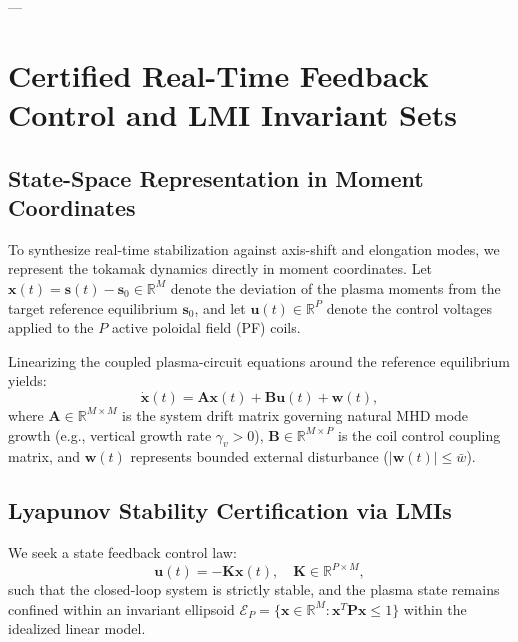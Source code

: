 \documentclass[11pt,a4paper]{article}
\begin{document}
---

\section{Certified Real-Time Feedback Control and LMI Invariant Sets}

\subsection{State-Space Representation in Moment Coordinates}
To synthesize real-time stabilization against axis-shift and elongation modes, we represent the tokamak dynamics directly in moment coordinates. Let $\bm{x}(t) = \bm{s}(t) - \bm{s}_0 \in \mathbb{R}^M$ denote the deviation of the plasma moments from the target reference equilibrium $\bm{s}_0$, and let $\bm{u}(t) \in \mathbb{R}^P$ denote the control voltages applied to the $P$ active poloidal field (PF) coils.

Linearizing the coupled plasma-circuit equations around the reference equilibrium yields:
\begin{equation}
    \dot{\bm{x}}(t) = \bm{A} \bm{x}(t) + \bm{B} \bm{u}(t) + \bm{w}(t),
    \label{eq:state_space}
\end{equation}
where $\bm{A} \in \mathbb{R}^{M \times M}$ is the system drift matrix governing natural MHD mode growth (e.g., vertical growth rate $\gamma_v > 0$), $\bm{B} \in \mathbb{R}^{M \times P}$ is the coil control coupling matrix, and $\bm{w}(t)$ represents bounded external disturbance ($|\bm{w}(t)| \le \bar{w}$).

\subsection{Lyapunov Stability Certification via LMIs}
We seek a state feedback control law:
\begin{equation}
    \bm{u}(t) = -\bm{K} \bm{x}(t), \quad \bm{K} \in \mathbb{R}^{P \times M},
\end{equation}
such that the closed-loop system is strictly stable, and the plasma state remains confined within an invariant ellipsoid $\mathcal{E}_P = \{ \bm{x} \in \mathbb{R}^M : \bm{x}^T \bm{P} \bm{x} \le 1 \}$ within the idealized linear model.
\end{document}
